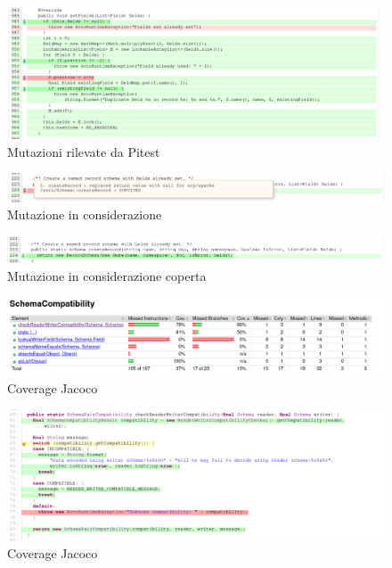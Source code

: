 \documentclass[12pt, a4paper]{article}
\begin{document}
  \begin{figure}
    \includegraphics[width=\linewidth]{./images/create_record/PitCoverage4.png}
    \caption{Mutazioni rilevate da Pitest}
    \label{fig:PitMutationCreateRecord4}
  \end{figure}
  \clearpage
  \begin{figure}
    \includegraphics[width=\linewidth]{./images/create_record/PitCoverage5.png}
    \caption{Mutazione in considerazione}
    \label{fig:PitMutationCreateRecord5}
  \end{figure}

  \begin{figure}
    \includegraphics[width=\linewidth]{./images/create_record/PitCoverage6.png}
    \caption{Mutazione in considerazione coperta}
    \label{fig:PitMutationCreateRecord6}
  \end{figure}

  \begin{figure}
    \includegraphics[width=\linewidth]{./images/schema_compatibiity/JacocoCoverage1.png}
    \caption{Coverage Jacoco}
    \label{fig:JacocoCoverageSchemaCompatibility1}
  \end{figure}

  \begin{figure}
    \includegraphics[width=\linewidth]{./images/schema_compatibiity/JacocoCoverage2.png}
    \caption{Coverage Jacoco}
    \label{fig:JacocoCoverageSchemaCompatibility2}
  \end{figure}
\end{document}
